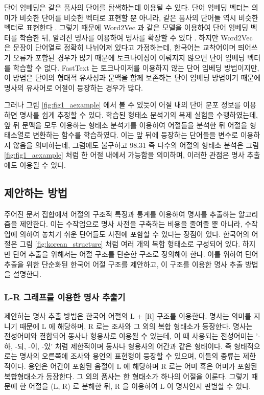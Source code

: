 \documentclass[11pt]{article}
\begin{document}
단어 임베딩은 같은 품사의 단어를 탐색하는데 이용될 수 있다.
단어 임베딩 벡터는 의미가 비슷한 단어를 비슷한 벡터로 표현할 뿐 아니라, 같은 품사의 단어들 역시 비슷한 벡터로 표현한다 \citep{bengio2003neural}.
그렇기 때문에 Word2Vec 과 같은 모델을 이용하여 단어 임베딩 벡터를 학습한 뒤, 알려진 명사를 이용하여 명사를 확장할 수 있다 \citep{mikolov2013distributed} .
하지만 Word2Vec 은 문장이 단어열로 정확히 나뉘어져 있다고 가정하는데, 한국어는 교착어이며 띄어쓰기 오류가 포함된 경우가 많기 때문에 토크나이징이 이뤄지지 않으면 단어 임베딩 벡터를 학습할 수 없다.
FastText \citep{bojanowski2017enriching} 는 토크나이저를 이용하지 않는 단어 임베딩 방법이지만, 이 방법은 단어의 형태적 유사성과 문맥을 함께 보존하는 단어 임베딩 방법이기 때문에 명사의 유사어로 어절이 등장하는 경우가 많다.

그러나 그림 \ref{fig:fig1_aexample} 에서 볼 수 있듯이 어절 내의 단어 분포 정보를 이용하면 명사를 쉽게 추정할 수 있다.
\citep{shim2016cloning} 학습된 형태소 분석기의 복제 실험을 수행하였는데, 앞 뒤 문맥을 모두 이용하는 형태소 분석기를 이용하여 어절들을 분석한 뒤 어절을 형태소열로 변환하는 함수를 학습하였다.
이는 앞 뒤에 등장하는 단어들을 변수로 이용하지 않음을 의미하는데, 그럼에도 불구하고 98.31 %
즉 다수의 어절의 형태소 분석은 그림 \ref{fig:fig1_aexample} 처럼 한 어절 내에서 가능함을 의미하며, 이러한 관점은 명사 추출에도 이용될 수 있다.




\subsection{제안하는 방법}

주어진 문서 집합에서 어절의 구조적 특징과 통계를 이용하여 명사를 추출하는 알고리즘을 제안한다.
이는 수작업으로 명사 사전을 구축하는 비용을 줄여줄 뿐 아니라, 수작업에 의하여 놓치기 쉬운 단어들도 사전에 포함할 수 있다는 장점이 있다.
한국어의 어절은 그림 \ref{fig:korean_structure} 처럼 여러 개의 복합 형태소로 구성되어 있다.
하지만 단어 추출을 위해서는 어절 구조를 단순한 구조로 정의해야 한다.
이를 위하여 단어 추출을 위한 단순화된 한국어 어절 구조를 제안하고, 이 구조를 이용한 명사 추출 방법을 설명한다.

\subsubsection{L-R 그래프를 이용한 명사 추출기}

제안하는 명사 추출 방법은 한국어 어절의 L + [R] 구조를 이용한다.
명사는 의미를 지니기 때문에 L 에 해당하며, R 로는 조사와 그 외의 복합 형태소가 등장한다.
명사는 전성어미와 결합되어 동사나 형용사로 이용될 수 있는데, 이 때 사용되는 전성어미는 '-하, -되, -이, -있' 처럼 제한적이며 동사나 형용사의 어간과 같은 형태이다.
즉 형태적으로는 명사의 오른쪽에 조사와 용언의 표현형이 등장할 수 있으며, 이들의 종류는 제한적이다.
용언은 어간이 포함된 음절이 L 에 해당하며 R 로는 어미 혹은 어미가 포함된 복합형태소가 등장한다.
그 외의 품사는 한 형태소가 하나의 어절을 이룬다.
그렇기 때문에 한 어절을 (L, R) 로 분해한 뒤, R 을 이용하여 L 이 명사인지 판별할 수 있다.
\end{document}
